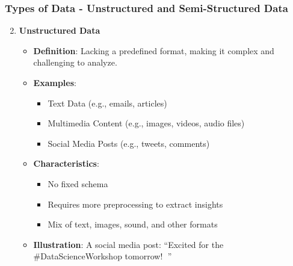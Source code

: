 \documentclass[aspectratio=169]{beamer}
\begin{document}
\begin{frame}[fragile]
    \frametitle{Types of Data - Unstructured and Semi-Structured Data}
    \begin{enumerate}
        \setcounter{enumi}{1}
        \item \textbf{Unstructured Data}
            \begin{itemize}
                \item \textbf{Definition}: Lacking a predefined format, making it complex and challenging to analyze.
                \item \textbf{Examples}:
                    \begin{itemize}
                        \item Text Data (e.g., emails, articles)
                        \item Multimedia Content (e.g., images, videos, audio files)
                        \item Social Media Posts (e.g., tweets, comments)
                    \end{itemize}
                \item \textbf{Characteristics}:
                    \begin{itemize}
                        \item No fixed schema
                        \item Requires more preprocessing to extract insights
                        \item Mix of text, images, sound, and other formats
                    \end{itemize}
                \item \textbf{Illustration}: 
                    A social media post: ``Excited for the \#DataScienceWorkshop tomorrow! 🎉''
            \end{itemize}


\end{enumerate}
\end{frame}
\end{document}
